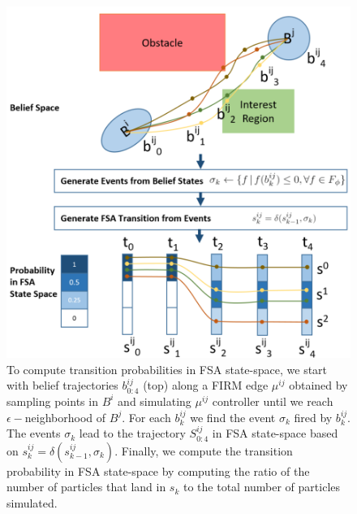 \documentclass[conference]{IEEEtran}
\begin{document}
\begin{figure}[h!]
	\centering
	\includegraphics[width=\columnwidth]{figs/BeliefRabinTransitionV3.png}
	\caption{To compute transition probabilities in FSA state-space, we start with belief trajectories $b^{ij}_{0:4}$ (top) along a FIRM edge $\mu^{ij}$ obtained by sampling points in $B^i$ and simulating $\mu^{ij}$ controller until we reach $\epsilon-$neighborhood of $B^j$. For each $b^{ij}_k$ we find the event $\sigma_k$ fired by $b^{ij}_k$. The events $\sigma_k$ lead to the trajectory $S^{ij}_{0:4}$ in FSA state-space based on $s^{ij}_k = \delta(s^{ij}_{k-1},\sigma_k)$. Finally, we compute the transition probability in FSA state-space by computing the ratio of the number of particles that land in $s_k$ to the total number of particles simulated.}
	\label{fig:TransProb}
\end{figure}
\end{document}
